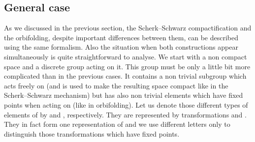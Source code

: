 \documentclass[a4paper,12pt]{article}
\def\cT{{\cal T}}
\def\cZ{{\cal Z}}
\def\bN{{\bf N}}
\begin{document}
\subsection{General case}
\label{generalcase}

As we discussed in the previous section, the Scherk--Schwarz
compactification and the orbifolding, despite important 
differences between them, can be described using the same
formalism. Also the situation when both constructions appear
simultaneously is quite straightforward to analyse. We start with a
non compact space \myHighlight{$\bN$}\coordHE{} and a discrete  
group \coordHE{} acting on it. This group \coordHE{} must be only a little bit more
complicated than in the previous cases. It contains a non trivial
subgroup which acts freely on \myHighlight{$\bN$}\coordHE{} (and is used to make the resulting
space compact like in the Scherk--Schwarz mechanism) but has also
non trivial elements which have fixed points when acting on \myHighlight{$\bN$}\coordHE{}
(like in orbifolding). Let us denote those different types of elements
of \coordHE{} by \coordHE{} and \coordHE{}, respectively. They are represented by
transformations \myHighlight{$\cT_g$}\coordHE{} and \myHighlight{$\cZ_h$}\coordHE{}. They in fact form one
representation of \coordHE{} and we use different letters only to distinguish
those transformations which have fixed points.
\end{document}
